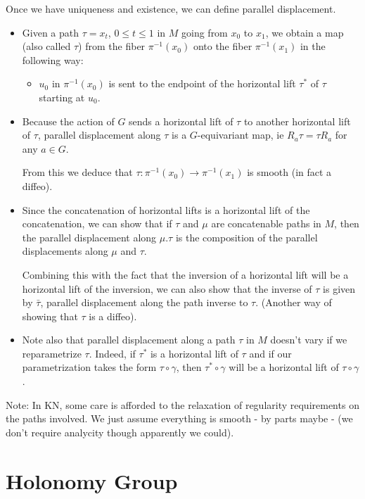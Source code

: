 \documentclass{report}
\theoremstyle{definition}
\begin{document}
Once we have uniqueness and existence, we can define parallel displacement.
\begin{itemize}
    \item Given a path $\tau=x_t$, $0\leq t\leq 1$ in $M$ going from $x_0$ to $x_1$, we obtain a map (also called $\tau$) from the fiber $\pi^{-1}(x_0)$ onto the fiber $\pi^{-1}(x_1)$ in the following way:
    \begin{itemize}
        \item $u_0$ in $\pi^{-1}(x_0)$ is sent to the endpoint of the horizontal lift $\tau^*$ of $\tau$ starting at $u_0$.
    \end{itemize}
    \item Because the action of $G$ sends a horizontal lift of $\tau$ to another horizontal lift of $\tau$, parallel displacement along $\tau$ is a $G$-equivariant map, ie $R_a\tau=\tau R_a$ for any $a\in G$.

    From this we deduce that $\tau:\pi^{-1}(x_0)\to\pi^{-1}(x_1)$ is smooth (in fact a diffeo).
    \item Since the concatenation of horizontal lifts is a horizontal lift of the concatenation, we can show that if $\tau$ and $\mu$ are concatenable paths in $M$, then the parallel displacement along $\mu.\tau$ is the composition of the parallel displacements along $\mu$ and $\tau$.

    Combining this with the fact that the inversion of a horizontal lift will be a horizontal lift of the inversion, we can also show that the inverse of $\tau$ is given by $\bar{\tau}$, parallel displacement along the path inverse to $\tau$. (Another way of showing that $\tau$ is a diffeo).
    \item Note also that parallel displacement along a path $\tau$ in $M$ doesn't vary if we reparametrize $\tau$. Indeed, if $\tau^*$ is a horizontal lift of $\tau$ and if our parametrization takes the form $\tau\circ\gamma$, then $\tau^*\circ\gamma$ will be a horizontal lift of $\tau\circ\gamma$.
\end{itemize}

Note: In KN, some care is afforded to the relaxation of regularity requirements on the paths involved. We just assume everything is smooth - by parts maybe - (we don't require analycity though apparently we could).

\section{Holonomy Group}
\end{document}
